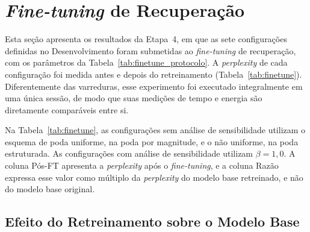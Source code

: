 \section{\textit{Fine-tuning} de Recuperação}\label{sec:res_finetune}

Esta seção apresenta os resultados da Etapa~4, em que as sete configurações definidas no
Desenvolvimento foram submetidas ao \textit{fine-tuning} de recuperação,
com os parâmetros da Tabela~\ref{tab:finetune_protocolo}. A \textit{perplexity} de cada
configuração foi medida antes e depois do retreinamento (Tabela~\ref{tab:finetune}).
Diferentemente das varreduras, esse experimento foi executado integralmente em uma única
sessão, de modo que suas medições de tempo e energia são diretamente comparáveis entre si.

Na Tabela~\ref{tab:finetune}, as configurações sem análise de sensibilidade utilizam o esquema
de poda uniforme, na poda por magnitude, e o não uniforme, na poda estruturada. As
configurações com análise de sensibilidade utilizam $\beta = 1{,}0$. A coluna Pós-FT apresenta
a \textit{perplexity} após o \textit{fine-tuning}, e a coluna Razão expressa esse valor como
múltiplo da \textit{perplexity} do modelo base retreinado, e não do modelo base original.

\begin{table}[htb]
\centering
\caption{\textit{Perplexity} antes (\textit{one-shot}) e depois do \textit{fine-tuning} de
recuperação.}
\label{tab:finetune}
\small

\end{table}

\subsection{Efeito do Retreinamento sobre o Modelo Base}\label{subsec:controle_denso}

